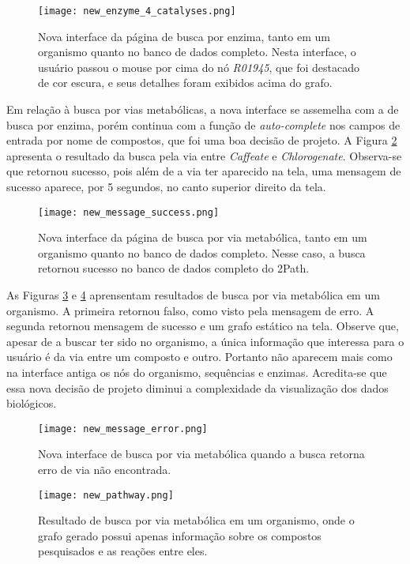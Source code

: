 \begin{figure}[!h]
	\centering
	\texttt{[image: new\_enzyme\_4\_catalyses.png]}
	\caption{Nova interface da página de busca por enzima, tanto em um organismo quanto no banco de dados completo. Nesta interface, o usuário passou o mouse por cima do nó \textit{R01945}, que foi destacado de cor escura, e seus detalhes foram exibidos acima do grafo.}
	\label{fig:new_enzyme_4_catalyses}
\end{figure}

\indent Em relação à busca por vias metabólicas, a nova interface se assemelha com a de busca por enzima, porém continua com a função de \textit{auto-complete} nos campos de entrada por nome de compostos, que foi uma boa decisão de projeto. A Figura \ref{fig:new_message_success} apresenta o resultado da busca pela via entre \textit{Caffeate} e \textit{Chlorogenate}. Observa-se que retornou sucesso, pois além de a via ter aparecido na tela, uma mensagem de sucesso aparece, por 5 segundos, no canto superior direito da tela.

\begin{figure}[!h]
    \centering
    \texttt{[image: new\_message\_success.png]}
    \caption{Nova interface da página de busca por via metabólica, tanto em um organismo quanto no banco de dados completo. Nesse caso, a busca retornou sucesso no banco de dados completo do 2Path.}
    \label{fig:new_message_success}
\end{figure}

\indent As Figuras \ref{fig:new_message_error} e \ref{fig:new_pathway} aprensentam resultados de busca por via metabólica em um organismo. A primeira retornou falso, como visto pela mensagem de erro. A segunda retornou mensagem de sucesso e um grafo estático na tela. Observe que, apesar de a buscar ter sido no organismo, a única informação que interessa para o usuário é da via entre um composto e outro. Portanto não aparecem mais como na interface antiga os nós do organismo, sequências e enzimas. Acredita-se que essa nova decisão de projeto diminui a complexidade da visualização dos dados biológicos.

\begin{figure}[!h]
    \centering
    \texttt{[image: new\_message\_error.png]}
    \caption{Nova interface de busca por via metabólica quando a busca retorna erro de via não encontrada.}
    \label{fig:new_message_error}
\end{figure}

\newpage
\begin{figure}[!t]
    \centering
    \texttt{[image: new\_pathway.png]}
    \caption{Resultado de busca por via metabólica em um organismo, onde o grafo gerado possui apenas informação sobre os compostos pesquisados e as reações entre eles.}
    \label{fig:new_pathway}
\end{figure}




